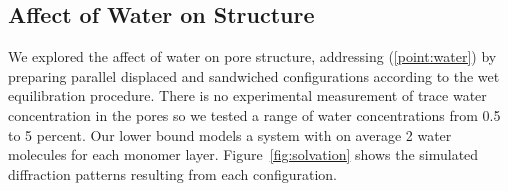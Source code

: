 \documentclass[journal=jpcbfk,manusciprt=article]{achemso}
\begin{document}
  \subsection{Affect of Water on Structure}

  We explored the affect of water on pore structure, addressing (\ref{point:water})
  by preparing parallel displaced and sandwiched configurations according to the
  wet equilibration procedure. There is no experimental measurement of trace
  water concentration in the pores so we tested a range of water concentrations
  from 0.5 to 5 percent. Our lower bound models a system with on average 2 water
  molecules for each monomer layer. Figure~\ref{fig:solvation} shows the
  simulated diffraction patterns resulting from each configuration.

  \newlength{\tempdima}
  \newcommand{\rowname}[1]%
  {\rotatebox{90}{\makebox[\tempdima][c]{\textbf{#1}}}}
  
  \renewcommand{\thesubfigure}{\alph{subfigure}}
  \newcommand{\mycaption}[1]%
  {\refstepcounter{subfigure}\textbf{(\thesubfigure) }{\ignorespaces #1}}
  
\end{document}
